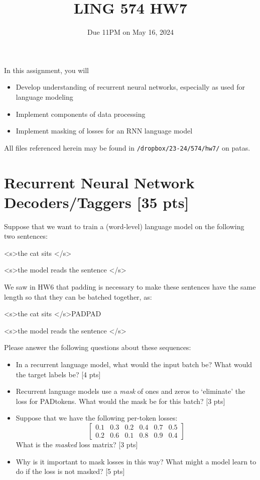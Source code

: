 \documentclass[11pt]{article}
\newcommand{\bos}{\textless s\textgreater\:}
\newcommand{\eos}{\textless /s\textgreater\:}
\newcommand{\pad}{PAD\:}
\begin{document}
\title{LING 574 HW7}
\date{\vspace{-0.2in}Due 11PM on May 16, 2024}
\maketitle


\noindent In this assignment, you will 
\begin{itemize}
  \item Develop understanding of recurrent neural networks, especially as used for language modeling
  \item Implement components of data processing 
  \item Implement masking of losses for an RNN language model
\end{itemize}
All files referenced herein may be found in \texttt{/dropbox/23-24/574/hw7/} on patas.


\section{Recurrent Neural Network Decoders/Taggers [35 pts]}

  Suppose that we want to train a (word-level) language model on the following two sentences:
\begin{center}
  \bos the cat sits \eos

  \bos the model reads the sentence \eos
\end{center}
We saw in HW6 that padding is necessary to make these sentences have the same length so that they can be batched together, as:
\begin{center}
  \bos the cat sits \eos \pad \pad

  \bos the model reads the sentence \eos
\end{center}
Please answer the following questions about these sequences:
\begin{itemize}
  \item In a recurrent language model, what would the input batch be?  What would the target labels be? \hfill [4 pts]
  \item Recurrent language models use a \emph{mask} of ones and zeros to `eliminate' the loss for \pad tokens.  What would the mask be for this batch? \hfill [3 pts]
  \item Suppose that we have the following per-token losses:
    \[ \begin{bmatrix} 0.1 & 0.3 & 0.2 & 0.4 & 0.7 & 0.5 \\ 0.2 & 0.6 & 0.1 & 0.8 & 0.9 & 0.4 \end{bmatrix} \]
    What is the \emph{masked} loss matrix? \hfill [3 pts]
  \item Why is it important to mask losses in this way?  What might a model learn to do if the loss is not masked? \hfill [5 pts]
\end{itemize}
\end{document}
